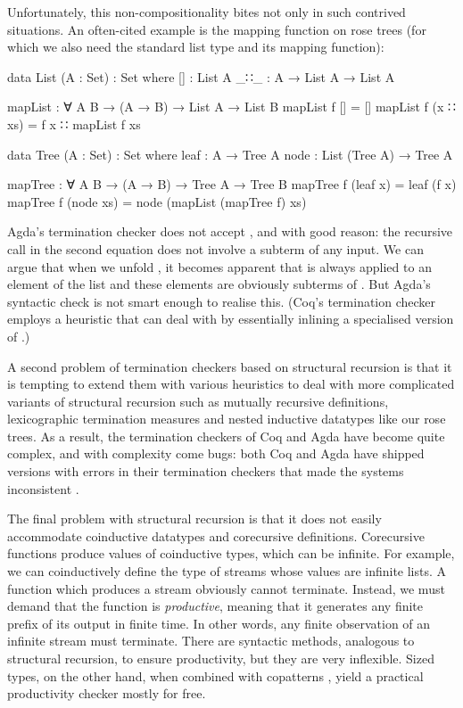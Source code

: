 Unfortunately, this non-compositionality bites not only in such contrived
situations. An often-cited example is the mapping function on rose trees (for
which we also need the standard list type and its mapping function):
\begin{code}
  data List (A : Set) : Set where
    []  : List A
    _∷_ : A → List A → List A

  mapList : ∀ {A B} → (A → B) → List A → List B
  mapList f []       = []
  mapList f (x ∷ xs) = f x ∷ mapList f xs

  data Tree (A : Set) : Set where
    leaf : A → Tree A
    node : List (Tree A) → Tree A

  mapTree : ∀ {A B} → (A → B) → Tree A → Tree B
  mapTree f (leaf x)  = leaf (f x)
  mapTree f (node xs) = node (mapList (mapTree f) xs)
\end{code}
Agda's termination checker does not accept , and with good
reason: the recursive call in the second equation does not involve a subterm of
any input. We can argue that when we unfold , it becomes apparent
that  is always applied to an element of the list  and
these elements are obviously subterms of . But Agda's syntactic check
is not smart enough to realise this. (Coq's termination checker employs a
heuristic that can deal with  by essentially inlining a
specialised version of .)

A second problem of termination checkers based on structural recursion is that
it is tempting to extend them with various heuristics to deal with more
complicated variants of structural recursion such as mutually recursive
definitions, lexicographic termination measures and nested inductive datatypes
like our rose trees. As a result, the termination checkers of Coq and Agda have
become quite complex, and with complexity come bugs: both Coq and Agda have
shipped versions with errors in their termination checkers that made the systems
inconsistent \cite{coqbug2013,agdabug2013}.

The final problem with structural recursion is that it does not easily
accommodate coinductive datatypes and corecursive definitions. Corecursive
functions produce values of coinductive types, which can be infinite. For
example, we can coinductively define the type of streams whose values are
infinite lists. A function which produces a stream obviously cannot terminate.
Instead, we must demand that the function is \emph{productive}, meaning that it
generates any finite prefix of its output in finite time. In other words, any
finite observation of an infinite stream must terminate. There are syntactic
methods, analogous to structural recursion, to ensure productivity, but they are
very inflexible. Sized types, on the other hand, when combined with copatterns
\cite{abel2016}, yield a practical productivity checker mostly for free.

